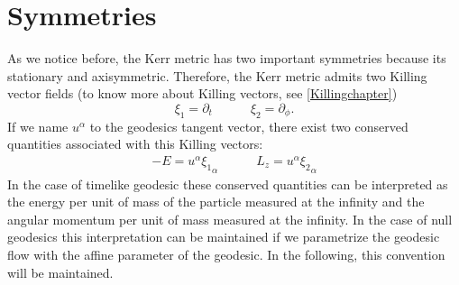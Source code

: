 \section{Symmetries}

As we notice before, the Kerr metric has two important symmetries because its stationary and axisymmetric. Therefore, the Kerr metric admits two Killing vector fields (to know more about Killing vectors, see \vref{Killingchapter})
\begin{equation}\label{killvec}
 \xi_1= \partial_t \quad \quad \quad \xi_2=\partial_\phi.
\end{equation}
If we name $u^\alpha$ to the geodesics tangent vector, there exist two conserved quantities associated with this Killing vectors:
\begin{align}\label{conserved11}
 -E = u^\alpha {\xi_1}_\alpha \quad \quad \quad L_z=u^\alpha {\xi_2}_\alpha
\end{align}
In the case of timelike geodesic these conserved quantities can be interpreted as the energy per unit of mass of the particle measured at the infinity and the angular momentum per unit of mass measured at the infinity. In the case of null geodesics this interpretation can be maintained if we parametrize the geodesic flow with the affine parameter of the geodesic. In the following, this convention will be maintained. 

